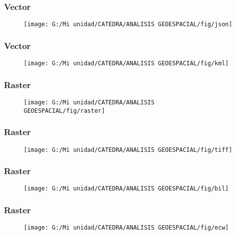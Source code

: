 \documentclass[14pt]{beamer}
\begin{document}
\begin{frame}
\frametitle{Vector}
  \begin{figure}
    \centering
    \texttt{[image: G:/Mi unidad/CATEDRA/ANALISIS GEOESPACIAL/fig/json]}
  \end{figure}
\end{frame}
\begin{frame}
\frametitle{Vector}
  \begin{figure}
    \centering
    \texttt{[image: G:/Mi unidad/CATEDRA/ANALISIS GEOESPACIAL/fig/kml]}
  \end{figure}
\end{frame}
\begin{frame}
\frametitle{Raster}
  \begin{figure}
    \centering
    \texttt{[image: G:/Mi unidad/CATEDRA/ANALISIS GEOESPACIAL/fig/raster]}
  \end{figure}
\end{frame}
\begin{frame}
\frametitle{Raster}
  \begin{figure}
    \centering
    \texttt{[image: G:/Mi unidad/CATEDRA/ANALISIS GEOESPACIAL/fig/tiff]}
  \end{figure}
\end{frame}
\begin{frame}
\frametitle{Raster}
  \begin{figure}
    \centering
    \texttt{[image: G:/Mi unidad/CATEDRA/ANALISIS GEOESPACIAL/fig/bil]}
  \end{figure}
\end{frame}
\begin{frame}
\frametitle{Raster}
  \begin{figure}
    \centering
    \texttt{[image: G:/Mi unidad/CATEDRA/ANALISIS GEOESPACIAL/fig/ecw]}
  \end{figure}
\end{frame}
\end{document}
